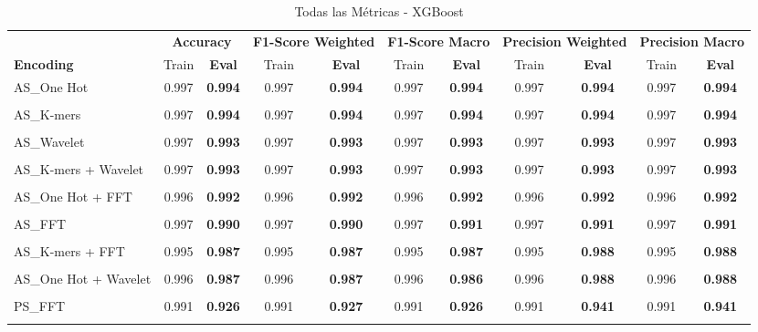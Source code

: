\begin{table*}[htbp]
\centering
\caption{Todas las Métricas - XGBoost}
\label{tab:xgboost_complete}
\scriptsize
\begin{tabular}{lcccccccccc}
\toprule
& \multicolumn{2}{c}{\textbf{Accuracy}} & \multicolumn{2}{c}{\textbf{F1-Score Weighted}} & \multicolumn{2}{c}{\textbf{F1-Score Macro}} & \multicolumn{2}{c}{\textbf{Precision Weighted}} & \multicolumn{2}{c}{\textbf{Precision Macro}} \\
\cmidrule(lr){2-3} \cmidrule(lr){4-5} \cmidrule(lr){6-7} \cmidrule(lr){8-9} \cmidrule(lr){10-11}
\textbf{Encoding} & Train & \textbf{Eval} & Train & \textbf{Eval} & Train & \textbf{Eval} & Train & \textbf{Eval} & Train & \textbf{Eval} \\
\midrule
AS\_One Hot & 0.997 & \textbf{0.994} & 0.997 & \textbf{0.994} & 0.997 & \textbf{0.994} & 0.997 & \textbf{0.994} & 0.997 & \textbf{0.994} \\\\
AS\_K-mers & 0.997 & \textbf{0.994} & 0.997 & \textbf{0.994} & 0.997 & \textbf{0.994} & 0.997 & \textbf{0.994} & 0.997 & \textbf{0.994} \\\\
AS\_Wavelet & 0.997 & \textbf{0.993} & 0.997 & \textbf{0.993} & 0.997 & \textbf{0.993} & 0.997 & \textbf{0.993} & 0.997 & \textbf{0.993} \\\\
AS\_K-mers + Wavelet & 0.997 & \textbf{0.993} & 0.997 & \textbf{0.993} & 0.997 & \textbf{0.993} & 0.997 & \textbf{0.993} & 0.997 & \textbf{0.993} \\\\
AS\_One Hot + FFT & 0.996 & \textbf{0.992} & 0.996 & \textbf{0.992} & 0.996 & \textbf{0.992} & 0.996 & \textbf{0.992} & 0.996 & \textbf{0.992} \\\\
AS\_FFT & 0.997 & \textbf{0.990} & 0.997 & \textbf{0.990} & 0.997 & \textbf{0.991} & 0.997 & \textbf{0.991} & 0.997 & \textbf{0.991} \\\\
AS\_K-mers + FFT & 0.995 & \textbf{0.987} & 0.995 & \textbf{0.987} & 0.995 & \textbf{0.987} & 0.995 & \textbf{0.988} & 0.995 & \textbf{0.988} \\\\
AS\_One Hot + Wavelet & 0.996 & \textbf{0.987} & 0.996 & \textbf{0.987} & 0.996 & \textbf{0.986} & 0.996 & \textbf{0.988} & 0.996 & \textbf{0.988} \\\\
PS\_FFT & 0.991 & \textbf{0.926} & 0.991 & \textbf{0.927} & 0.991 & \textbf{0.926} & 0.991 & \textbf{0.941} & 0.991 & \textbf{0.941} \\\\

\end{tabular}
\end{table*}
